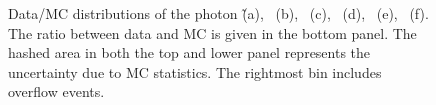 \begin{figure}[htbp]
		\caption{Data/MC distributions of the photon \pt\~(a), \mttwo~(b), \mtbmin~(c), \mtbmax~(d), \HT~(e), \drbb~(f). The ratio between data and MC is given in the bottom panel. The hashed area in both the top and lower panel represents the uncertainty due to MC statistics. The rightmost bin includes overflow events.}
		\label{fig:ttV} 
		\end{figure}


